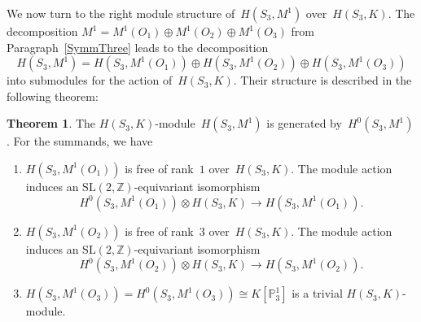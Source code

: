 \documentclass[12pt]{article}
\newcounter{num}
\theoremstyle{definition}
\newtheorem{Theorem}[Satz]{Theorem}
\theoremstyle{break}
\newcommand{\Z}{\mathbb{Z}}
\newcommand{\SL}{\mathrm{SL}}
\renewcommand{\P}{\mathbb{P}}
\renewcommand{\1}{\mathbbm{1}}
\renewcommand{\P}{\mathbb{P}}
\newcommand{\ot}{\mathbin{\otimes}}
\begin{document}
We now turn to the right module structure of~$H(S_3, M^1)$ over~$H(S_3, K)$. The decomposition $M^1 = M^1(O_1) \oplus M^1(O_2) \oplus M^1(O_3)$ from Paragraph~\ref{SymmThree} leads to the decomposition
\[H(S_3, M^1) = H(S_3, M^1(O_1)) \oplus H(S_3, M^1(O_2)) \oplus H(S_3, M^1(O_3))\]
into submodules for the action of~$H(S_3, K)$. Their structure is described in the following theorem:
\begin{Theorem} \label{ModStrucChar2}
The $H(S_3, K)$-module~$H(S_3, M^1)$ is generated by~$H^0(S_3, M^1)$. For the summands, we have
\begin{enumerate}
\item
$H(S_3, M^1(O_1))$ is free of rank~$1$ over~$H(S_3, K)$. The module action induces an $\SL(2, \Z)$-equivariant isomorphism
\[H^0(S_3, M^1(O_1)) \ot H(S_3, K) \to H(S_3, M^1(O_1)).\]

\item
$H(S_3, M^1(O_2))$ is free of rank~$3$ over~$H(S_3, K)$. The module action induces an $\SL(2, \Z)$-equivariant isomorphism
\[H^0(S_3, M^1(O_2)) \ot H(S_3, K) \to H(S_3, M^1(O_2)).\]

\item
$H(S_3, M^1(O_3)) = H^0(S_3, M^1(O_3)) \cong K[\P^1_3]$ is a trivial $H(S_3, K)$-module.
\end{enumerate}
\end{Theorem}
\end{document}

